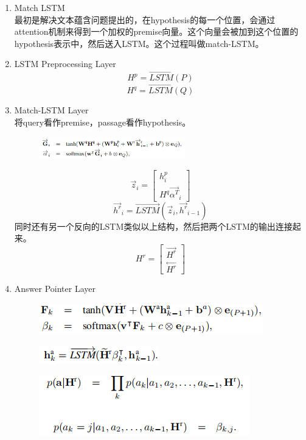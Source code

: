 \documentclass[a4paper,UTF8]{article}
\numberwithin{equation}{section}
\begin{document}
\begin{enumerate}
	\item Match LSTM\\最初是解决文本蕴含问题提出的，在hypothesis的每一个位置，会通过attention机制来得到一个加权的premise向量。这个向量会被加到这个位置的hypothesis表示中，然后送入LSTM。这个过程叫做match-LSTM。
	\item LSTM Preprocessing Layer$$H^p = \overset{\rightarrow}{LSTM}(P)$$ $$H^q = \overset{\rightarrow}{LSTM}(Q)$$
	\item Match-LSTM Layer\\将query看作premise，passage看作hypothesis。
	\begin{figure}[H]
		\centering
		\includegraphics[width=0.6\textwidth]{3-2.png}
	\end{figure}
	$$\overset{\rightarrow}{z}_i = 
	\begin{bmatrix}
		h_i^p\\ 
		H^q\overset{\rightarrow}{\alpha^T}_i
	\end{bmatrix}
	$$
	$$\overset{\rightarrow}{h^r}_i=\overset{\rightarrow}{LSTM}(\overset{\rightarrow}{z}_i,\overset{\rightarrow}{h^{r}}_{i-1})$$
	同时还有另一个反向的LSTM类似以上结构，然后把两个LSTM的输出连接起来。
	$$H^r=\begin{bmatrix}
		\overset{\rightarrow}{H^r}\\
		\overset{\leftarrow}{H^r}
	\end{bmatrix}$$
	\item Answer Pointer Layer\\
	\begin{figure}[H]
		\centering
		\includegraphics[]{3-3.png}
	\end{figure}
	\begin{figure}[H]
		\centering
		\includegraphics[]{3-4.png}
	\end{figure}
	\begin{figure}[H]
		\centering
		\includegraphics[]{3-5.png}

\end{figure}
\end{enumerate}
\end{document}
